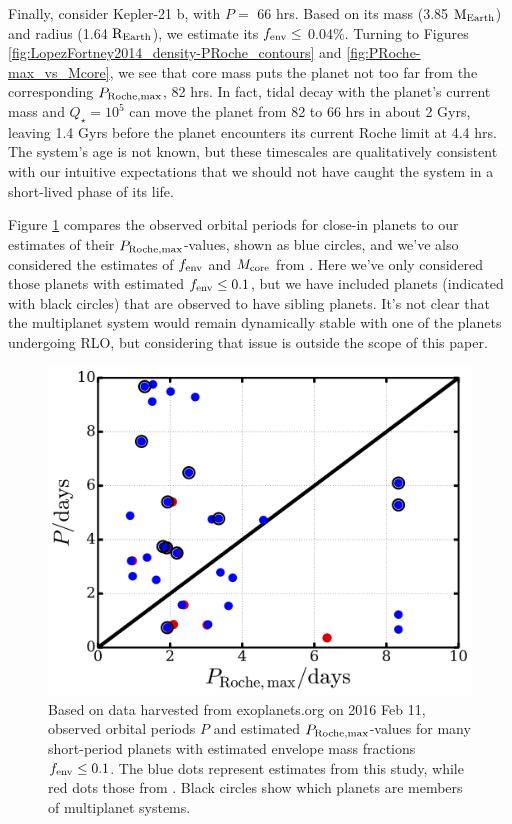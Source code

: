 \documentclass{svjour3}                     %
\begin{document}
Finally, consider Kepler-21 b, with $P =$ 66 hrs. Based on its mass (3.85 ${\rm M_{Earth}}$) and radius (1.64 ${\rm R_{Earth}}$), we estimate its $f_{\rm env} \le$ 0.04\%. Turning to Figures \ref{fig:LopezFortney2014_density-PRoche_contours} and \ref{fig:PRoche-max_vs_Mcore}, we see that core mass puts the planet not too far from the corresponding $P_{\rm Roche, max}$, 82 hrs. In fact, tidal decay with the planet's current mass and $Q_\star = 10^5$ can move the planet from 82 to 66 hrs in about 2 Gyrs, leaving 1.4 Gyrs before the planet encounters its current Roche limit at 4.4 hrs. The system's age is not known, but these timescales are qualitatively consistent with our intuitive expectations that we should not have caught the system in a short-lived phase of its life.

Figure \ref{fig:P_vs_PRoche-max} compares the observed orbital periods for close-in planets to our estimates of their $P_{\rm Roche, max}$-values, shown as blue circles, and we've also considered the estimates of $f_{\rm env}$ and $M_{\rm core}$ from \cite{Lopez2014Understanding}. Here we've only considered those planets with estimated $f_{\rm env} \le 0.1$, but we have included planets (indicated with black circles) that are observed to have sibling planets. It's not clear that the multiplanet system would remain dynamically stable with one of the planets undergoing RLO, but considering that issue is outside the scope of this paper.

\begin{figure}
\includegraphics[width=\textwidth]{P_vs_PRoche-max}
\caption{Based on data harvested from exoplanets.org on 2016 Feb 11, observed orbital periods $P$ and estimated $P_{\rm Roche, max}$-values for many short-period planets with estimated envelope mass fractions $f_{\rm env} \le 0.1$. The blue dots represent estimates from this study, while red dots those from \cite{Lopez2014Understanding}. Black circles show which planets are members of multiplanet systems.}
\label{fig:P_vs_PRoche-max}
\end{figure}
\end{document}
